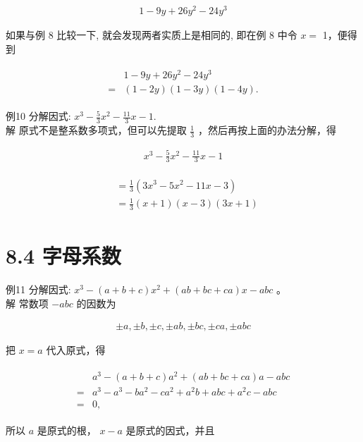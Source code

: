 \documentclass[10pt]{article}
\begin{document}
\begin{align*}
1-9 y+26 y^{2}-24 y^{3}
\end{align*}

如果与例 8 比较一下, 就会发现两者实质上是相同的, 即在例 8 中令 $x=$ 1，便得到

\begin{align*}
\begin{aligned}
& 1-9 y+26 y^{2}-24 y^{3} \\
= & (1-2 y)(1-3 y)(1-4 y) .
\end{aligned}
\end{align*}

例10 分解因式: $x^{3}-\frac{5}{3} x^{2}-\frac{11}{3} x-1$.\\
解 原式不是整系数多项式，但可以先提取 $\frac{1}{3}$ ，然后再按上面的办法分解，得

\begin{align*}
x^{3}-\frac{5}{3} x^{2}-\frac{11}{3} x-1
\end{align*}

\begin{align*}
\begin{aligned}
& =\frac{1}{3}\left(3 x^{3}-5 x^{2}-11 x-3\right) \\
& =\frac{1}{3}(x+1)(x-3)(3 x+1)
\end{aligned}
\end{align*}

\section*{8.4 字母系数}
例11 分解因式: $x^{3}-(a+b+c) x^{2}+(a b+b c+c a) x-a b c$ 。\\
解 常数项 $-a b c$ 的因数为

\begin{align*}
\pm a, \pm b, \pm c, \pm a b, \pm b c, \pm c a, \pm a b c
\end{align*}

把 $x=a$ 代入原式，得

\begin{align*}
\begin{aligned}
& a^{3}-(a+b+c) a^{2}+(a b+b c+c a) a-a b c \\
= & a^{3}-a^{3}-b a^{2}-c a^{2}+a^{2} b+a b c+a^{2} c-a b c \\
= & 0,
\end{aligned}
\end{align*}

所以 $a$ 是原式的根， $x-a$ 是原式的因式，并且
\end{document}
